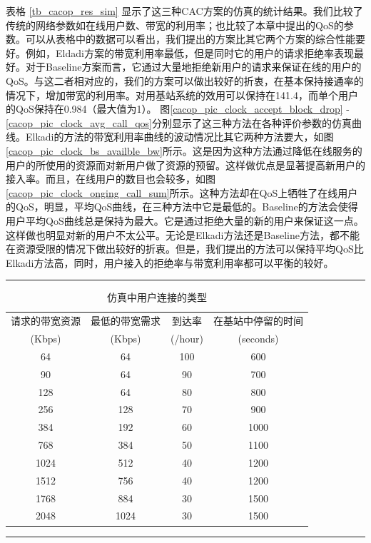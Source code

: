 表格 \ref{tb_cacop_res_sim} 显示了这三种CAC方案的仿真的统计结果。我们比较了传统的网络参数如在线用户数、带宽的利用率；也比较了本章中提出的QoS的参数。可以从表格中的数据可以看出，我们提出的方案比其它两个方案的综合性能要好。例如，Eldadi方案的带宽利用率最低，但是同时它的用户的请求拒绝率表现最好。对于Baseline方案而言，它通过大量地拒绝新用户的请求来保证在线的用户的QoS。与这二者相对应的，我们的方案可以做出较好的折衷，在基本保持接通率的情况下，增加带宽的利用率。对用基站系统的效用可以保持在141.4，而单个用户的QoS保持在0.984（最大值为1）。
图\ref{cacop_pic_clock_accept_block_drop} - \ref{cacop_pic_clock_avg_call_qos}分别显示了这三种方法在各种评价参数的仿真曲线。Elkadi的方法的带宽利用率曲线的波动情况比其它两种方法要大，如图\ref{cacop_pic_clock_bs_availble_bw}所示。这是因为这种方法通过降低在线服务的用户的所使用的资源而对新用户做了资源的预留。这样做优点是显著提高新用户的接入率。而且，在线用户的数目也会较多，如图\ref{cacop_pic_clock_onging_call_sum}所示。这种方法却在QoS上牺牲了在线用户的QoS，明显，平均QoS曲线，在三种方法中它是最低的。Baseline的方法会使得用户平均QoS曲线总是保持为最大。它是通过拒绝大量的新的用户来保证这一点。这样做也明显对新的用户不太公平。无论是Elkadi方法还是Baseline方法，都不能在资源受限的情况下做出较好的折衷。但是，我们提出的方法可以保持平均QoS比Elkadi方法高，同时，用户接入的拒绝率与带宽利用率都可以平衡的较好。

\begin{table}[tb]
\caption{仿真中用户连接的类型} \label{tb_sim_cfg}
\begin{center}
\def\temptablewidth{1\textwidth}
{\rule{\temptablewidth}{1pt}}
\begin{tabular*}{\temptablewidth}{@{\extracolsep{\fill}}cccc}
请求的带宽资源 & 最低的带宽需求 &到达率 &在基站中停留的时间 \\
(Kbps) & (Kbps) & (/hour) &(seconds) \\
\hline
 64 &64 & 100 &600\\
90 &64 &90 &700\\
128 &64 &80 &800\\
256 &128 &70 &900\\
384 &192 &60 &1000\\
768 &384 &50 &1100\\
1024 &512 &40 &1200\\
1512 &756 &40 &1200\\
1768 &884 &30 &1500\\
2048 &1024 &30 &1500\\ \hline
\end{tabular*}
 {\rule{\temptablewidth}{1pt}}
 \end{center}
 \end{table}

